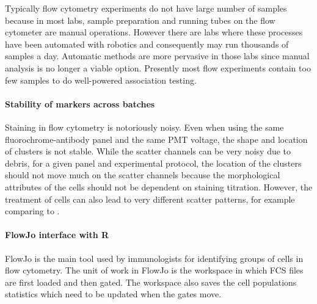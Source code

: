 Typically flow cytometry experiments do not have large number of samples because in most labs, sample preparation and running tubes on the flow cytometer are manual operations.
However there are labs where these processes have been automated with robotics
and consequently may run thousands of samples a day.
Automatic methods are more pervasive in those labs since manual analysis is no longer a viable option.
Presently most flow experiments contain too few samples to do well-powered association testing.


\paragraph{ Stability of markers across batches }

Staining in flow cytometry is notoriously noisy.
Even when using the same fluorochrome-antibody panel and the same PMT voltage, the shape and location of clusters is not stable.
While the scatter channels can be very noisy due to debris, for a given panel and experimental protocol,
the location of the clusters should not move much on the scatter channels because the morphological attributes of the cells should not be dependent on staining titration.
However, the treatment of cells can also lead to very different scatter patterns, for example comparing  to .

\paragraph{ FlowJo interface with R}

FlowJo is the main tool used by immunologists for identifying groups of cells in flow cytometry.
The unit of work in FlowJo is the workspace in which FCS files are first loaded and then gated.
The workspace also saves the cell populations statistics which need to be updated when the gates move.

